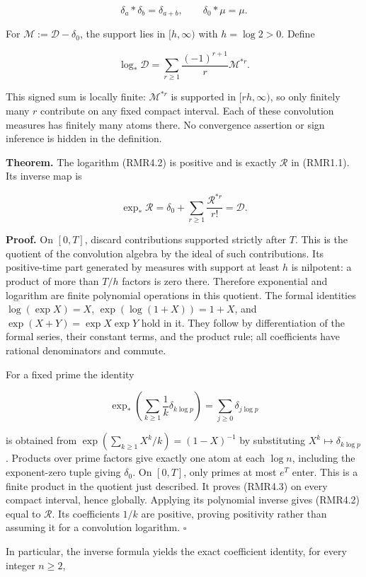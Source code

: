 \documentclass[
]{article}
\begin{document}
\[
\delta_a*\delta_b=\delta_{a+b},\qquad \delta_0*\mu=\mu.
\tag{RMR4.1}
\]

For \(\mathcal M:=\mathcal D-\delta_0\), the support lies in
\([h,\infty)\) with \(h=\log2>0\). Define

\[
\log_*\mathcal D
=\sum_{r\ge1}\frac{(-1)^{r+1}}r\mathcal M^{*r}.
\tag{RMR4.2}
\]

This signed sum is locally finite: \(\mathcal M^{*r}\) is supported in
\([rh,\infty)\), so only finitely many \(r\) contribute on any fixed
compact interval. Each of these convolution measures has finitely many
atoms there. No convergence assertion or sign inference is hidden in the
definition.

\textbf{Theorem.} The logarithm (RMR4.2) is positive and is exactly
\(\mathcal R\) in (RMR1.1). Its inverse map is

\[
\exp_*\mathcal R
=\delta_0+\sum_{r\ge1}\frac{\mathcal R^{*r}}{r!}
=\mathcal D.
\tag{RMR4.3}
\]

\textbf{Proof.} On \([0,T]\), discard contributions supported strictly
after \(T\). This is the quotient of the convolution algebra by the
ideal of such contributions. Its positive-time part generated by
measures with support at least \(h\) is nilpotent: a product of more
than \(T/h\) factors is zero there. Therefore exponential and logarithm
are finite polynomial operations in this quotient. The formal identities
\(\log(\exp X)=X\), \(\exp(\log(1+X))=1+X\), and
\(\exp(X+Y)=\exp X\exp Y\) hold in it. They follow by differentiation of
the formal series, their constant terms, and the product rule; all
coefficients have rational denominators and commute.

For a fixed prime the identity

\[
\exp_*\left(\sum_{k\ge1}\frac1k\delta_{k\log p}\right)
=\sum_{j\ge0}\delta_{j\log p}
\tag{RMR4.4}
\]

is obtained from \(\exp(\sum_{k\ge1}X^k/k)=(1-X)^{-1}\) by substituting
\(X^k\mapsto\delta_{k\log p}\). Products over prime factors give exactly
one atom at each \(\log n\), including the exponent-zero tuple giving
\(\delta_0\). On \([0,T]\), only primes at most \(e^T\) enter. This is a
finite product in the quotient just described. It proves (RMR4.3) on
every compact interval, hence globally. Applying its polynomial inverse
gives (RMR4.2) equal to \(\mathcal R\). Its coefficients \(1/k\) are
positive, proving positivity rather than assuming it for a convolution
logarithm. \(\square\)

In particular, the inverse formula yields the exact coefficient
identity, for every integer \(n\ge2\),
\end{document}

